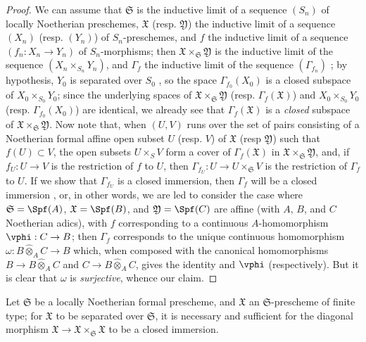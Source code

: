 \begin{proof}
We can assume that $\mathfrak{S}$ is the inductive limit of a sequence $(S_n)$ of locally Noetherian preschemes, $\mathfrak{X}$ (resp. $\mathfrak{Y}$) the inductive limit of a sequence $(X_n)$ (resp. $(Y_n)$) of $S_n$-preschemes, and $f$ the inductive limit of a sequence $(f_n:X_n\to Y_n)$ of $S_n$-morphisms;
then $\mathfrak{X}\times_\mathfrak{S}\mathfrak{Y}$ is the inductive limit of the sequence $(X_n\times_{S_n}Y_n)$, and $\Gamma_f$ the inductive limit of the sequence $(\Gamma_{f_n})$ ;
by hypothesis, $Y_0$ is separated over $S_0$ , so the space $\Gamma_{f_0}(X_0)$ is a closed subspace of $X_0\times_{S_0}Y_0$;
since the underlying spaces of $\mathfrak{X}\times_\mathfrak{S}\mathfrak{Y}$ (resp. $\Gamma_f(\mathfrak{X})$) and $X_0\times_{S_0}Y_0$ (resp. $\Gamma_{f_0}(X_0)$) are identical, we already see that $\Gamma_f(\mathfrak{X})$ is a \emph{closed} subspace of $\mathfrak{X}\times_\mathfrak{S}\mathfrak{Y}$.
Now note that, when $(U,V)$ runs over the set of pairs consisting of a Noetherian formal affine open subset $U$ (resp. $V$) of $\mathfrak{X}$ (resp $\mathfrak{Y}$) such that $f(U)\subset V$, the open subsets $U\times_S V$ form a cover of $\Gamma_f(\mathfrak{X})$ in $\mathfrak{X}\times_\mathfrak{S}\mathfrak{Y}$, and, if $f_U:U\to V$ is the restriction of $f$ to $U$, then $\Gamma_{f_U}:U\to U\times_\mathfrak{S}V$ is the restriction of $\Gamma_f$ to $U$.
If we show that $\Gamma_{f_U}$ is a closed immersion, then $\Gamma_f$ will be a closed immersion , or, in other words, we are led to consider the case where $\mathfrak{S}=\Spf(A)$, $\mathfrak{X}=\Spf(B)$, and $\mathfrak{Y}=\Spf(C)$ are affine (with $A$, $B$, and $C$ Noetherian adics), with $f$ corresponding to a continuous $A$-homomorphism $\vphi:C\to B$;
then $\Gamma_f$ corresponds to the unique continuous homomorphism $\omega: B\widehat{\otimes}_A C\to B$ which, when composed with the canonical homomorphisms $B\to B\widehat{\otimes}_A C$ and $C\to B\widehat{\otimes}_A C$, gives the identity and $\vphi$ (respectively).
But it is clear that $\omega$ is \emph{surjective}, whence our claim.
\end{proof}

\begin{corollary}[10.15.5]
\label{I.10.15.5}
Let $\mathfrak{S}$ be a locally Noetherian formal prescheme, and $\mathfrak{X}$ an $\mathfrak{S}$-prescheme of finite type;
for $\mathfrak{X}$ to be separated over $\mathfrak{S}$, it is necessary and sufficient for the diagonal morphism $\mathfrak{X}\to\mathfrak{X}\times_\mathfrak{S}\mathfrak{X}$ to be a closed immersion.
\end{corollary}

